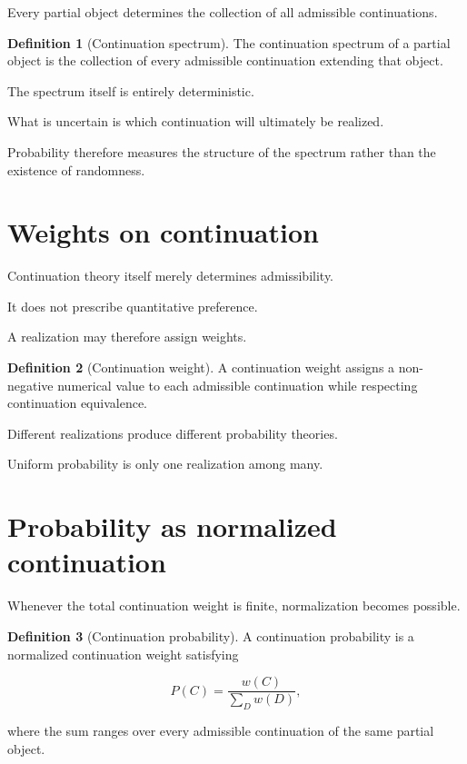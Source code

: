 \documentclass[13pt,openany]{book}
\theoremstyle{plain}
\theoremstyle{definition}
\newtheorem{definition}{Definition}[chapter]
\begin{document}
Every partial object determines the collection of all admissible
continuations.

\begin{definition}[Continuation spectrum]
The continuation spectrum of a partial object is the collection of every
admissible continuation extending that object.
\end{definition}

The spectrum itself is entirely deterministic.

What is uncertain is which continuation will ultimately be realized.

Probability therefore measures the structure of the spectrum rather than the
existence of randomness.

\section{Weights on continuation}

Continuation theory itself merely determines admissibility.

It does not prescribe quantitative preference.

A realization may therefore assign weights.

\begin{definition}[Continuation weight]
A continuation weight assigns a non-negative numerical value to each
admissible continuation while respecting continuation equivalence.
\end{definition}

Different realizations produce different probability theories.

Uniform probability is only one realization among many.

\section{Probability as normalized continuation}

Whenever the total continuation weight is finite, normalization becomes
possible.

\begin{definition}[Continuation probability]
A continuation probability is a normalized continuation weight satisfying

\[
P(C)
=
\frac{w(C)}
{\displaystyle\sum_{D}w(D)},
\]

where the sum ranges over every admissible continuation of the same partial
object.
\end{definition}
\end{document}
